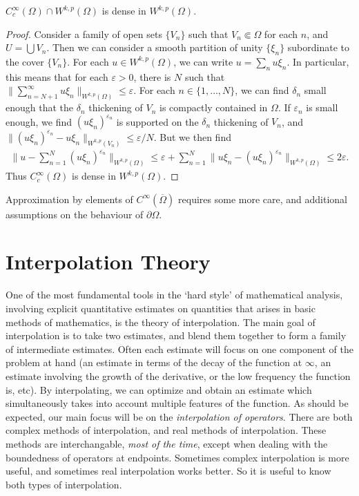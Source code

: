 \begin{theorem}
  $C^\infty_c(\Omega) \cap W^{k,p}(\Omega)$ is dense in $W^{k,p}(\Omega)$.
\end{theorem}
\begin{proof}
  Consider a family of open sets $\{ V_n \}$ such that $V_n \Subset \Omega$ for each $n$, and $U = \bigcup V_n$. Then we can consider a smooth partition of unity $\{ \xi_n \}$ subordinate to the cover $\{ V_n \}$. For each $u \in W^{k,p}(\Omega)$, we can write $u = \sum_n u \xi_n$. In particular, this means that for each $\varepsilon > 0$, there is $N$ such that $\| \sum_{n = N+1}^\infty u \xi_n \|_{W^{k,p}(\Omega)} \leq \varepsilon$. For each $n \in \{ 1, \dots, N \}$, we can find $\delta_n$ small enough that the $\delta_n$ thickening of $V_n$ is compactly contained in $\Omega$. If $\varepsilon_n$ is small enough, we find $(u \xi_n)^{\varepsilon_n}$ is supported on the $\delta_n$ thickening of $V_n$, and $\| (u \xi_n)^{\varepsilon_n} - u \xi_n \|_{W^{k,p}(V_n)} \leq \varepsilon / N$. But we then find
  \begin{align*}
    \| u - \sum_{n = 1}^N (u \xi_n)^{\varepsilon_n} \|_{W^{k,p}(\Omega)} \leq \varepsilon + \sum_{n = 1}^N \| u \xi_n - (u \xi_n)^{\varepsilon_n} \|_{W^{k,p}(\Omega)} \leq 2\varepsilon.
  \end{align*}
  Thus $C_c^\infty(\Omega)$ is dense in $W^{k,p}(\Omega)$.
\end{proof}

Approximation by elements of $C^\infty(\overline{\Omega})$ requires some more care, and additional assumptions on the behaviour of $\partial \Omega$.












\chapter{Interpolation Theory}

One of the most fundamental tools in the `hard style' of mathematical analysis, involving explicit quantitative estimates on quantities that arises in basic methods of mathematics, is the theory of interpolation. The main goal of interpolation is to take two estimates, and blend them together to form a family of intermediate estimates. Often each estimate will focus on one component of the problem at hand (an estimate in terms of the decay of the function at $\infty$, an estimate involving the growth of the derivative, or the low frequency the function is, etc). By interpolating, we can optimize and obtain an estimate which simultaneously takes into account multiple features of the function. As should be expected, our main focus will be on the \emph{interpolation of operators}. There are both complex methods of interpolation, and real methods of interpolation. These methods are interchangable, \emph{most of the time}, except when dealing with the boundedness of operators at endpoints. Sometimes complex interpolation is more useful, and sometimes real interpolation works better. So it is useful to know both types of interpolation.

